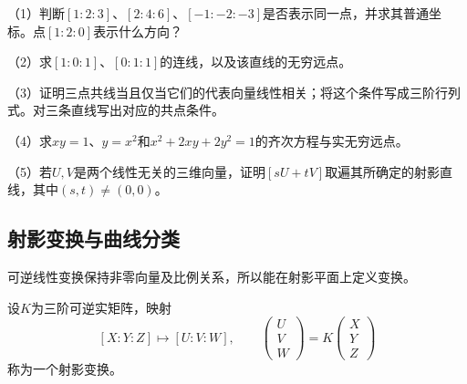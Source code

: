 \begin{exercise}
\mbox{}\par\nobreak
\begin{samepage}
（1）判断\([1:2:3]\)、\([2:4:6]\)、\([-1:-2:-3]\)是否表示同一点，并求其普通坐标。点\([1:2:0]\)表示什么方向？
\par
\end{samepage}

\begin{samepage}
（2）求\([1:0:1]\)、\([0:1:1]\)的连线，以及该直线的无穷远点。
\par
\end{samepage}

\begin{samepage}
（3）证明三点共线当且仅当它们的代表向量线性相关；将这个条件写成三阶行列式。对三条直线写出对应的共点条件。
\par
\end{samepage}

\begin{samepage}
（4）求\(xy=1\)、\(y=x^2\)和\(x^2+2xy+2y^2=1\)的齐次方程与实无穷远点。
\par
\end{samepage}

\begin{samepage}
（5）若\(U,V\)是两个线性无关的三维向量，证明\([sU+tV]\)取遍其所确定的射影直线，其中\((s,t)\ne(0,0)\)。
\par
\end{samepage}
\end{exercise}

\subsection{射影变换与曲线分类}
\label{subsec:quadratic-projective-classification}

可逆线性变换保持非零向量及比例关系，所以能在射影平面上定义变换。

\begin{definition}
设\(K\)为三阶可逆实矩阵，映射
\begin{equation}\label{eq:quadratic-projectivity}
 [X:Y:Z]\longmapsto[U:V:W],\qquad
 \begin{pmatrix}U\\V\\W\end{pmatrix}
 =K\begin{pmatrix}X\\Y\\Z\end{pmatrix}
\end{equation}
称为一个{\heiti{}射影变换}。
\end{definition}

